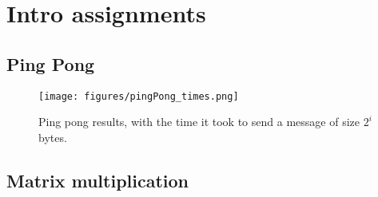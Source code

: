 \setcounter{section}{-1}
\section{Intro assignments}
\subsection{Ping Pong}

\begin{figure}[h]
    \centering
    \texttt{[image: figures/pingPong\_times.png]}
    \caption{Ping pong results, with the time it took to send a message of size $2^i$ bytes.}
    \label{fig:pingpong}
\end{figure}


\subsection{Matrix multiplication}

